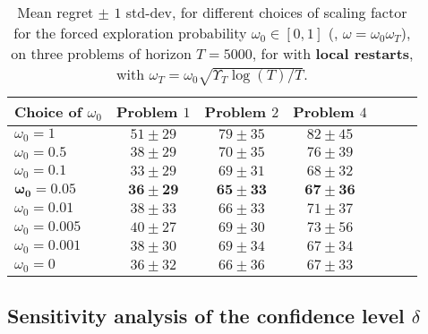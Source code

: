 \begin{table}[ht]
    \centering
    \begin{tabular}{l|cccccc}
        \textbf{Choice of} $\omega_0$ & Problem $1$ & Problem $2$ & Problem $4$ \\
        \hline
        $\omega_0=1$     & $51 \pm 29$ & $79 \pm 35$ & $82 \pm 45$ \\
        $\omega_0=0.5$   & $38 \pm 29$ & $70 \pm 35$ & $76 \pm 39$ \\
        $\omega_0=0.1$   & $33 \pm 29$ & $69 \pm 31$ & $68 \pm 32$ \\
        $\mathbf{\omega_0=0.05}$  & $\mathbf{36 \pm 29}$ & $\mathbf{65 \pm 33}$ & $\mathbf{67 \pm 36}$ \\
        $\omega_0=0.01$  & $38 \pm 33$ & $66 \pm 33$ & $71 \pm 37$ \\
        $\omega_0=0.005$ & $40 \pm 27$ & $69 \pm 30$ & $73 \pm 56$ \\
        $\omega_0=0.001$ & $38 \pm 30$ & $69 \pm 34$ & $67 \pm 34$ \\
        $\omega_0=0$     & $36 \pm 32$ & $66 \pm 36$ & $67 \pm 33$
    \end{tabular}
    \caption{Mean regret $\pm$ $1$ std-dev, for different choices of scaling factor for the forced exploration probability $\omega_0\in[0,1]$ (\ie, $\omega=\omega_0 \omega_T$), on three problems of horizon $T=5000$, for \GLRklUCB{} with \textbf{local restarts}, with $\omega_T = \omega_0\sqrt{\Upsilon_T \log(T)/T}$.}
    \label{table:6:sensibilityAlpha0}
\end{table}


\subsection{Sensitivity analysis of the confidence level $\delta$}\label{sec:6:choosingDelta}

